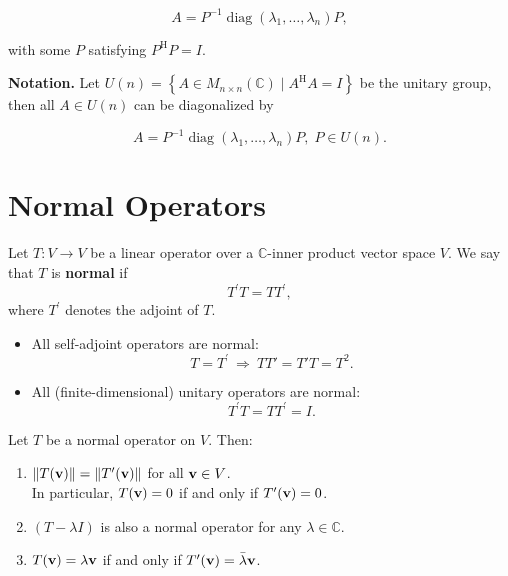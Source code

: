 \[
A = P^{-1}\operatorname{diag}\left( {{\lambda }_{1},\ldots,{\lambda }_{n}}\right) P,
\]

with some \(P\) satisfying \(P^{\mathrm{H}}P = I\).

\textbf{Notation.} Let \(U\left( n\right)  = \left\{  {A \in  {M}_{n \times  n}\left( \mathbb{C}\right)  \mid  {A}^{\mathrm{H}}A = I}\right\}\) be the unitary group, then all \(A \in  U\left( n\right)\) can be diagonalized by

\[
A = {P}^{-1}\operatorname{diag}\left( {{\lambda }_{1},\ldots,{\lambda }_{n}}\right) P,\;P \in  U\left( n\right).
\]

\section{Normal Operators}

\begin{definition}
Let \( T : V \to V \) be a linear operator over a \( \mathbb{C} \)-inner product vector space \( V \). We say that \( T \) is \textbf{normal} if
\[
T^\prime T = T T^\prime,
\]
where \( T^\prime \) denotes the adjoint of \( T \).
\end{definition}

\begin{example}\leavevmode
\begin{itemize}
    \item All self-adjoint operators are normal:
    \[
    T = T^\prime \ \Rightarrow\  T T' = T' T = T^2.
    \]

    \item All (finite-dimensional) unitary operators are normal:
    \[
    T^\prime T = T T^\prime = I.
    \]
\end{itemize}
\end{example}

\begin{proposition}
Let \( T \) be a normal operator on \( V \). Then:
\begin{enumerate}
    \item \( \|T({\bf v})\| = \|T'({\bf v})\| \) for all \( {\bf v} \in V \).\\
    In particular, \( T({\bf v}) = 0 \) if and only if \( T'({\bf v}) = 0 \).
    
    \item \( (T - \lambda I) \) is also a normal operator for any \( \lambda \in \mathbb{C} \).

    \item \( T({\bf v}) = \lambda {\bf v} \) if and only if \( T'({\bf v}) = \bar{\lambda} {\bf v} \).
\end{enumerate}
\end{proposition}

